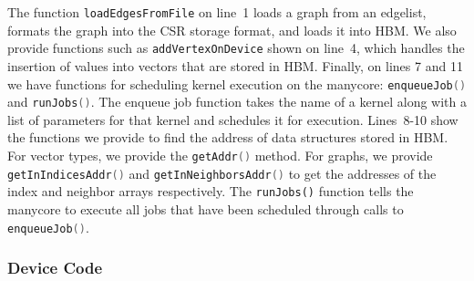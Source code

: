 The function \lstinline[language=C++, basicstyle=\small\ttfamily]{loadEdgesFromFile} on line~1 loads a graph from an edgelist, formats the graph into the CSR storage format, and loads it into HBM. 
We also provide functions such as \lstinline[language=C++, basicstyle=\small\ttfamily]{addVertexOnDevice} shown on line~4, which handles the insertion of values into vectors that are stored in HBM. 
Finally, on lines 7 and 11 we have functions for scheduling kernel execution on the manycore: \lstinline[language=C++, basicstyle=\small\ttfamily]{enqueueJob()} and \lstinline[language=C++, basicstyle=\small\ttfamily]{runJobs()}.
The enqueue job function takes the name of a kernel along with a list of parameters for that kernel and schedules it for execution.
Lines~8-10 show the functions we provide to find the address of data structures stored in HBM. 
For vector types, we provide the \lstinline[language=C++, basicstyle=\small\ttfamily]{getAddr()} method.
For graphs, we provide \lstinline[language=C++, basicstyle=\small\ttfamily]{getInIndicesAddr()} and \lstinline[language=C++, basicstyle=\small\ttfamily]{getInNeighborsAddr()} to get the addresses of the index and neighbor arrays respectively.
The \lstinline{runJobs()} function tells the manycore to execute all jobs that have been scheduled through calls to \lstinline[language=C++, basicstyle=\small\ttfamily]{enqueueJob()}.

\subsubsection{Device Code}


